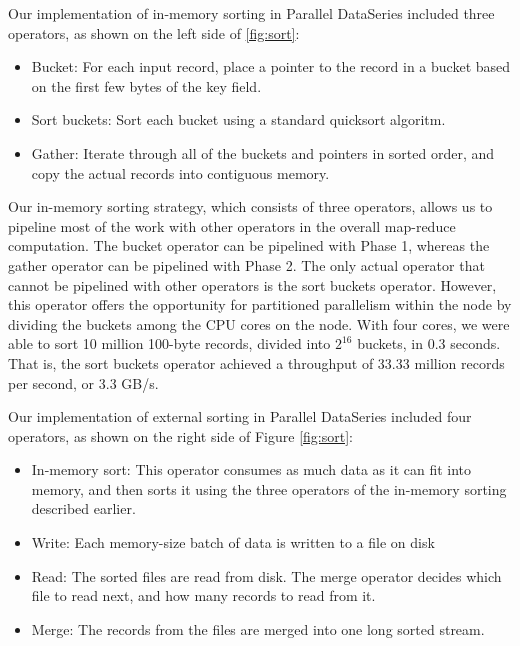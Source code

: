 \documentclass{acm_proc_article-sp}
\begin{document}
Our implementation of in-memory sorting in Parallel DataSeries included three operators, as shown on the left side of \ref{fig:sort}:
\begin{itemize}
  \item Bucket: For each input record, place a pointer to the record in a bucket based on the first few bytes of the key field.
  \item Sort buckets: Sort each bucket using a standard quicksort algoritm.
  \item Gather: Iterate through all of the buckets and pointers in sorted order, and copy the actual records into contiguous memory.
\end{itemize}

Our in-memory sorting strategy, which consists of three operators, allows us to pipeline most of the work with other operators in the overall map-reduce computation. The bucket operator can be pipelined with Phase 1, whereas the gather operator can be pipelined with Phase 2. The only actual operator that cannot be pipelined with other operators is the sort buckets operator. However, this operator offers the opportunity for partitioned parallelism within the node by dividing the buckets among the CPU cores on the node. With four cores, we were able to sort 10 million 100-byte records, divided into $2^{16}$ buckets, in 0.3 seconds. That is, the sort buckets operator achieved a throughput of 33.33 million records per second, or 3.3 GB/s.

Our implementation of external sorting in Parallel DataSeries included four operators, as shown on the right side of Figure \ref{fig:sort}:
\begin{itemize}
  \item In-memory sort: This operator consumes as much data as it can fit into memory, and then sorts it using the three operators of the in-memory sorting described earlier.
  \item Write: Each memory-size batch of data is written to a file on disk
  \item Read: The sorted files are read from disk. The merge operator decides which file to read next, and how many records to read from it.
  \item Merge: The records from the files are merged into one long sorted stream.
\end{itemize}
\end{document}
